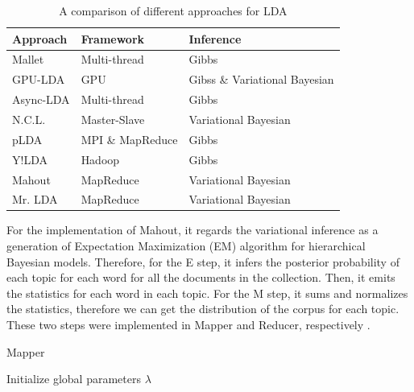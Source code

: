 \documentclass[conference]{IEEEtran}
\begin{document}
\begin{table}[!t]
\caption{A comparison of different approaches for LDA}
\label{lda_comp}
\centering
\begin{tabular}{lll}\hline
Approach  & Framework        & Inference                     \\ \hline
Mallet \cite{mallet}   & Multi-thread     & Gibbs                         \\
GPU-LDA \cite{yan2009parallel}   & GPU              & Gibss \& Variational Bayesian \\
Async-LDA \cite{smyth2008asynchronous} & Multi-thread     & Gibbs                         \\
N.C.L. \cite{mariote2007parallelized}   & Master-Slave     & Variational Bayesian          \\
pLDA \cite{wang2009plda}     & MPI \& MapReduce & Gibbs                         \\
Y!LDA \cite{smola2010architecture}    & Hadoop           & Gibbs                         \\
Mahout \cite{mahout_lda}   & MapReduce        & Variational Bayesian          \\
Mr. LDA \cite{zhai2012mr}   & MapReduce        & Variational Bayesian         \\\hline
\end{tabular}
\end{table}

For the implementation of Mahout, it regards the variational inference as a generation of Expectation Maximization (EM) algorithm for hierarchical Bayesian models. Therefore, for the E step, it infers the posterior probability of each topic for each word for all the documents in the collection. Then, it emits the statistics for each word in each topic. For the M step, it sums and normalizes the statistics, therefore we can get the distribution of the corpus for each topic. These two steps were implemented in Mapper and Reducer, respectively \cite{mahout_lda}. 

\begin{algorithm}
\caption{Mapper}
\label{alg:lda_map}
\begin{algorithmic}
\REQUIRE Initialize global parameters $\lambda$
    \ENDFOR
    		\ENDFOR
    \ENDFOR
\end{algorithmic}
\end{algorithm}
\end{document}
